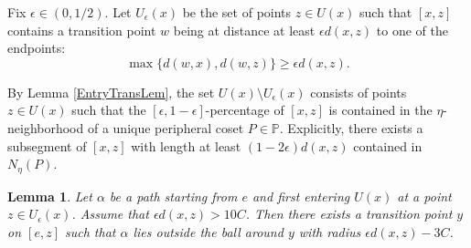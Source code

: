 \documentclass{amsart}
\newtheorem{lem}[thm]{Lemma}
\theoremstyle{definition}
\theoremstyle{remark}
\newcommand{\lw}[1]{{\color{cyan}{#1}}}
\begin{document}


Fix $\epsilon\in (0, 1/2)$.
Let $U_\epsilon(x)$ be the set of points $z\in U(x)$ such that $[x,z]$ contains a transition point $w$ being at distance at least $\epsilon d(x,z)$ to one of the endpoints:  $$ \max\{d( w, x), d(w,z)\}\ge \epsilon d(x,z).$$  

By  Lemma \ref{EntryTransLem}, the set $U(x)\setminus U_\epsilon(x)$
consists of points $z\in U(x)$ such that the $[\epsilon, 1-\epsilon]$-percentage of $[x,z]$ is contained in the $\eta$-neighborhood of a unique peripheral coset $P\in\mathbb P$. Explicitly, there exists a subsegment of $[x,z]$ with length at least $(1-2\epsilon)d(x,z)$ contained in $N_\eta(P)$.    

\begin{lem}\label{AvoidTransBall}
Let $\alpha$ be a path starting from $e$ and first entering $U(x)$ at a point $z\in U_\epsilon(x)$. 
Assume that $\epsilon d(x,z)>10C$. Then there exists a  transition point $y$   on $[e, z]$ such that $\alpha$ lies outside the ball around $y$ with radius $\epsilon d(x,z)-3C$.
\end{lem}
 
\end{document}
